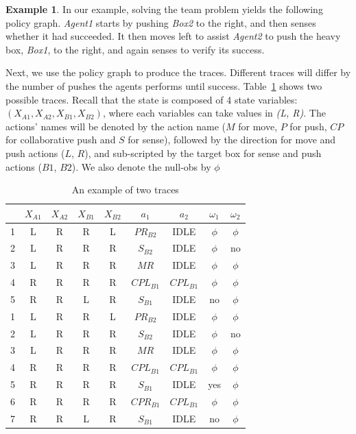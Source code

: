 \documentclass[letterpaper]{article} %
\theoremstyle{definition}
\newtheorem{example}{Example}
\begin{document}
\begin{example}
In our example, solving the team problem yields the following policy graph.
 \emph{Agent1} starts by pushing \emph{Box2} to the right, and then senses whether it had succeeded. It then moves left to assist \emph{Agent2} to push the heavy box, \emph{Box1}, to the right, and again senses to verify its success.

Next, we use the policy graph to produce the traces. Different
traces will differ by the number of pushes the agents performs until success.
Table~\ref{tbl:Traces} shows two possible traces.
Recall that the state is composed of 4 state variables: $(X_{A1}, X_{A2}, X_{B1}, X_{B2})$, where each variables can take values in \emph{(L, R)}. The actions' names will be denoted by the action name ($M$ for move, $P$ for push, $CP$ for collaborative push and $S$ for sense),
followed by the direction for move and push actions ($L$, $R$), and sub-scripted by the target box for sense and push actions ($B1$, $B2$).
We also denote the null-obs by $\phi$


\begin{table}[ht]
    \centering
    \scriptsize
    \begin{tabular}{|c||c|c|c|c||c|c||c|c|}
    \hline
     &$X_{A1}$&$X_{A2}$&$X_{B1}$&$X_{B2}$&$a_1$&$a_2$&$\omega_1$&$\omega_2$\\ \hline
    1 &L&R&R&L&$PR_{B2}$&IDLE&$\phi$& $\phi$\\
    2 &L&R&R&R&$S_{B2}$&IDLE&$\phi$& no\\
    3 &L&R&R&R&$MR$&IDLE&$\phi$&$\phi$\\
    4 &R&R&R&R&$CPL_{B1}$&$CPL_{B1}$&$\phi$&$\phi$\\
    5 &R&R&L&R&$S_{B1}$&IDLE&no&$\phi$\\ \hline
    \hline\hline
    1 &L&R&R&L&$PR_{B2}$&IDLE&$\phi$& $\phi$\\
    2 &L&R&R&R&$S_{B2}$&IDLE&$\phi$& no\\
    3 &L&R&R&R&$MR$&IDLE&$\phi$&$\phi$\\
    4 &R&R&R&R&$CPL_{B1}$&$CPL_{B1}$&$\phi$&$\phi$\\
    5 &R&R&R&R&$S_{B1}$&IDLE&yes&$\phi$\\
    6 &R&R&R&R&$CPR_{B1}$&$CPL_{B1}$&$\phi$&$\phi$\\
    7 &R&R&L&R&$S_{B1}$& IDLE&no&$\phi$\\ \hline
    \end{tabular}
    \caption{An example of two traces}
    \label{tbl:Traces}
\end{table}
\end{example}
\end{document}
